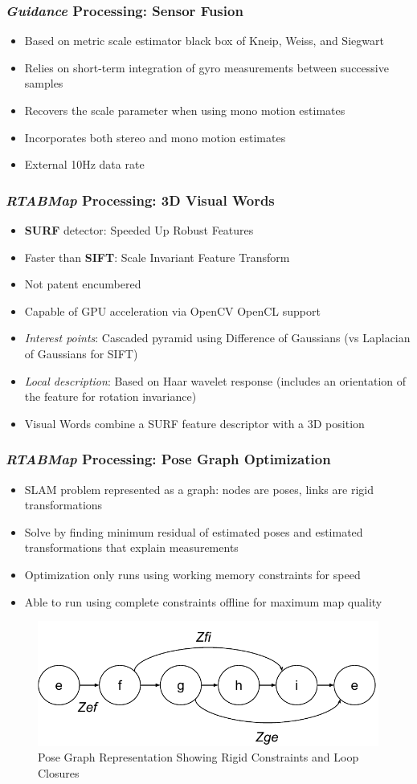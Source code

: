 \documentclass{beamer}
\begin{document}
\begin{frame}
\frametitle{\textit{Guidance} Processing: Sensor Fusion}
\begin{itemize}
\item{Based on metric scale estimator black box of Kneip, Weiss, and Siegwart}
\item{Relies on short-term integration of gyro measurements between successive samples}
\item{Recovers the scale parameter when using mono motion estimates}
\item{Incorporates both stereo and mono motion estimates}
\item{External 10Hz data rate}
\end{itemize}
\end{frame}

\begin{frame}
\frametitle{\textit{RTABMap} Processing: 3D Visual Words}
\begin{itemize}
\item{\textbf{SURF} detector: Speeded Up Robust Features}
\item{Faster than \textbf{SIFT}: Scale Invariant Feature Transform}
\item{Not patent encumbered}
\item{Capable of GPU acceleration via OpenCV OpenCL support} 
\item{\textit{Interest points}: Cascaded pyramid using Difference of Gaussians (vs Laplacian of Gaussians for SIFT)}
\item{\textit{Local description}: Based on Haar wavelet response (includes an orientation of the feature for rotation invariance)}
\item{Visual Words combine a SURF feature descriptor with a 3D position}
\end{itemize}
\end{frame}

\begin{frame}
\frametitle{\textit{RTABMap} Processing: Pose Graph Optimization}
\begin{itemize}
\item{SLAM problem represented as a graph: nodes are poses, links are rigid transformations}
\item{Solve by finding minimum residual of estimated poses and estimated transformations that explain measurements}
\item{Optimization only runs using working memory constraints for speed}
\item{Able to run using complete constraints offline for maximum map quality}
\end{itemize}
\begin{figure}
\includegraphics[width=0.5\linewidth]{figures/PoseGraph}
\caption{Pose Graph Representation Showing Rigid Constraints and Loop Closures}
\end{figure}
\end{frame}
\end{document}
